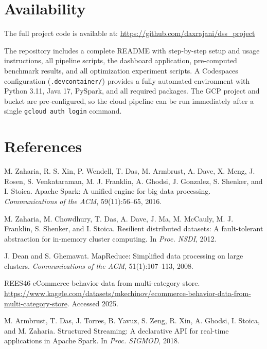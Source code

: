 \documentclass[letterpaper,twocolumn,10pt]{article}
\begin{document}
\section{Availability}

The full project code is available at:
\url{https://github.com/daxrajani/dss_project}

The repository includes a complete README with step-by-step setup and usage
instructions, all pipeline scripts, the dashboard application, pre-computed
benchmark results, and all optimization experiment scripts. A Codespaces
configuration (\texttt{.devcontainer/}) provides a fully automated environment
with Python 3.11, Java 17, PySpark, and all required packages. The GCP project
and bucket are pre-configured, so the cloud pipeline can be run immediately after
a single \texttt{gcloud auth login} command.

\section*{References}

\begin{small}
\begin{enumerate}[label={[\arabic*]}, leftmargin=*, nosep]

\item M. Zaharia, R. S. Xin, P. Wendell, T. Das, M. Armbrust, A. Dave, X. Meng,
J. Rosen, S. Venkataraman, M. J. Franklin, A. Ghodsi, J. Gonzalez, S. Shenker,
and I. Stoica. Apache Spark: A unified engine for big data processing.
\textit{Communications of the ACM}, 59(11):56--65, 2016.

\item M. Zaharia, M. Chowdhury, T. Das, A. Dave, J. Ma, M. McCauly, M. J. Franklin,
S. Shenker, and I. Stoica. Resilient distributed datasets: A fault-tolerant
abstraction for in-memory cluster computing. In \textit{Proc. NSDI}, 2012.

\item J. Dean and S. Ghemawat. MapReduce: Simplified data processing on large
clusters. \textit{Communications of the ACM}, 51(1):107--113, 2008.

\item REES46 eCommerce behavior data from multi-category store.
{\footnotesize\url{https://www.kaggle.com/datasets/mkechinov/ecommerce-behavior-data-from-multi-category-store}}.
Accessed 2025.

\item M. Armbrust, T. Das, J. Torres, B. Yavuz, S. Zeng, R. Xin, A. Ghodsi,
I. Stoica, and M. Zaharia. Structured Streaming: A declarative API for real-time
applications in Apache Spark. In \textit{Proc. SIGMOD}, 2018.

\end{enumerate}
\end{small}
\end{document}
